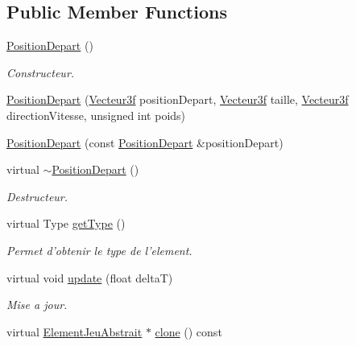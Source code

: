 \subsection*{Public Member Functions}
\begin{DoxyCompactItemize}
\item 
\hyperlink{group___i_n_f2990-04_ga2cd5d23fdefd5a5db303a8c7e2af9c3c}{Position\-Depart} ()
\begin{DoxyCompactList}\small\item\em Constructeur. \end{DoxyCompactList}\item 
\hyperlink{group___i_n_f2990-04_ga48b038debe01d96507a78be1940891f8}{Position\-Depart} (\hyperlink{group__utilitaire_ga6b2956069f76c7e27df4f79f87e5a48c}{Vecteur3f} position\-Depart, \hyperlink{group__utilitaire_ga6b2956069f76c7e27df4f79f87e5a48c}{Vecteur3f} taille, \hyperlink{group__utilitaire_ga6b2956069f76c7e27df4f79f87e5a48c}{Vecteur3f} direction\-Vitesse, unsigned int poids)
\item 
\hyperlink{group___i_n_f2990-04_ga407a4f493c341f2b9ce6f05d575676aa}{Position\-Depart} (const \hyperlink{class_position_depart}{Position\-Depart} \&position\-Depart)
\item 
virtual \hyperlink{group___i_n_f2990-04_ga7223f64532a213cd4faf6e29aa5c5a30}{$\sim$\-Position\-Depart} ()
\begin{DoxyCompactList}\small\item\em Destructeur. \end{DoxyCompactList}\item 
virtual Type \hyperlink{group___i_n_f2990-04_gae4b1d64b04abfd849ef302e41c6fc6d1}{get\-Type} ()
\begin{DoxyCompactList}\small\item\em Permet d'obtenir le type de l'element. \end{DoxyCompactList}\item 
virtual void \hyperlink{group___i_n_f2990-04_gac089935dcf561edb43c8a402e6f6ace5}{update} (float delta\-T)
\begin{DoxyCompactList}\small\item\em Mise a jour. \end{DoxyCompactList}\item 
\hypertarget{group___i_n_f2990-04_ga8d1a454a58e20a9dda3d393d2ed02271}{virtual \hyperlink{class_element_jeu_abstrait}{Element\-Jeu\-Abstrait} $\ast$ \hyperlink{group___i_n_f2990-04_ga8d1a454a58e20a9dda3d393d2ed02271}{clone} () const }\label{group___i_n_f2990-04_ga8d1a454a58e20a9dda3d393d2ed02271}


\end{DoxyCompactItemize}
